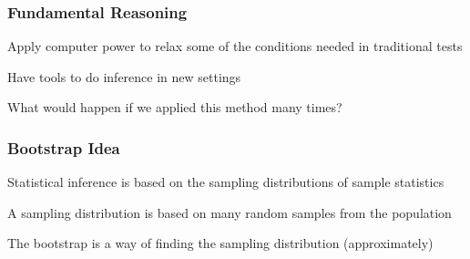 \documentclass[12pt]{beamer}\usepackage[]{graphicx}\usepackage[]{color}
\begin{document}

\begin{frame}
\frametitle{Fundamental Reasoning}

\bi
  \item Apply computer power to relax some of the conditions needed in traditional tests
  \item Have tools to do inference in new settings
  \item What would happen if we applied this method many times?
\ei

\end{frame}


\begin{frame}
\frametitle{Bootstrap Idea}

\bi
  \item Statistical inference is based on the sampling distributions of sample statistics
  \item A sampling distribution is based on many random samples from the population
  \item The bootstrap is a way of finding the sampling distribution (approximately)
\ei

\end{frame}

\end{document}
